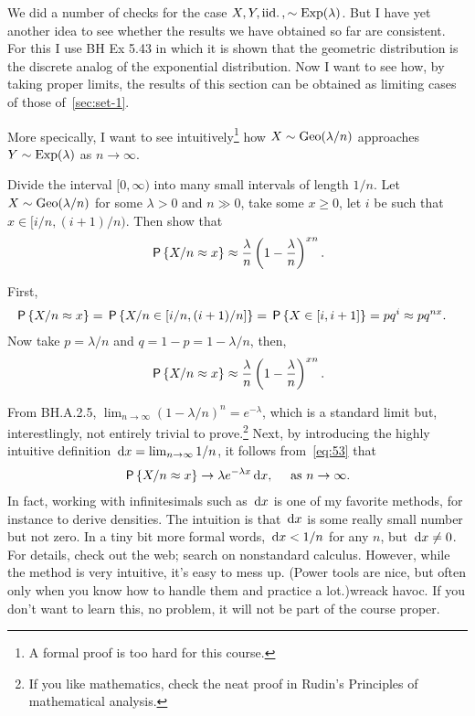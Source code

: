 \documentclass[a4paper,12pt]{article}
\begin{document}
We did a number of checks for the case $X, Y, \iid, \sim\Exp{\lambda}$.
But I have yet another idea to see whether the results we have obtained so far are consistent.
For this I use BH Ex 5.43 in which it is shown that the geometric distribution is the discrete analog of the exponential distribution. Now I want to see how, by taking proper limits, the results of this section can be obtained as limiting cases of those of~\cref{sec:set-1}. 

More specically, I want to see intuitively\footnote{A formal proof is too hard for this course.} how $X\sim \Geo{\lambda/n}$ approaches  $Y\sim\Exp{\lambda}$ as $n\to\infty$.

\begin{exercise}\label{ex:7} 
Divide the interval $[0, \infty)$ into many small intervals of length $1/n$.
Let  $X\sim \Geo{\lambda/n}$ for some $\lambda>0$ and $n\gg 0$, take  some $x\geq 0$,  let $i$ be such that $x\in[i/n, (i+1)/n)$.
Then show that 
\begin{align}\label{eq:53}
\P{X/n \approx x} \approx \frac{\lambda} n \left(1-\frac \lambda n\right)^{xn}.
\end{align}
\begin{solution}
First, 
\begin{align}
\P{X/n \approx x} &= \P{X/n \in [i/n, (i+1)/n]} = \P{X \in [i, i+1]} = p q^{i} \approx p q^{n x}.
\end{align}
Now take $p=\lambda/n$ and $q=1-p=1-\lambda/n$, then,
\begin{equation}
\P{X/n \approx x} \approx \frac{\lambda} n \left(1-\frac \lambda n\right)^{xn}.
\end{equation}
\end{solution}
\end{exercise}
From BH.A.2.5, $\lim_{n\to\infty}(1-\lambda/n)^{n} = e^{-\lambda}$, which is a standard limit but, interestlingly, not entirely trivial to prove.\footnote{If you like mathematics, check the neat proof in Rudin's Principles of mathematical analysis.}
Next, by introducing the highly intuitive definition $\d x = \lim_{n\to \infty} 1/n$, it follows from~\cref{eq:53} that 
\begin{align}
\P{X/n \approx x} \to \lambda e^{-\lambda x} \d x,\quad\text{ as } n \to \infty.
\end{align}
In fact, working with infinitesimals such as $\d x$ is one of my favorite methods, for instance to derive densities.
The intuition is that $\d x$ is some really small number but not zero.
In a tiny bit more formal words, $\d x < 1/n$ for any $n$, but $\d x \neq 0$.
For details, check out the web; search on nonstandard calculus.
However, while the method is very intuitive, it's easy to mess up. (Power tools are nice, but often only when you know how to handle them and practice a lot.)wreack havoc.
If you don't want to learn this, no problem, it will not be part of the course proper.
\end{document}
